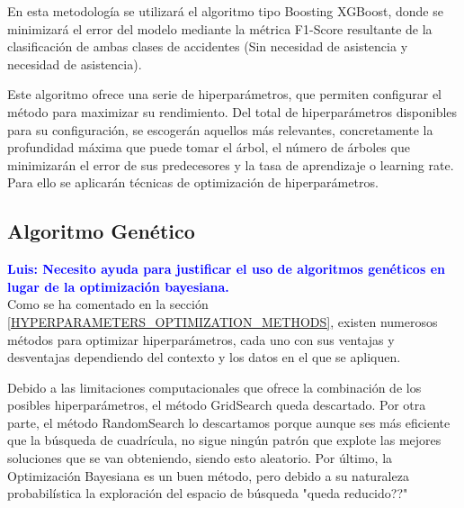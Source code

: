 \documentclass{uathesis-es}
\begin{document}
En esta metodología se utilizará el algoritmo tipo Boosting XGBoost, donde se minimizará el error del modelo mediante la métrica F1-Score resultante de la clasificación de ambas clases de accidentes (Sin necesidad de asistencia y necesidad de asistencia).

Este algoritmo ofrece una serie de hiperparámetros, que permiten configurar el método para maximizar su rendimiento. Del total de hiperparámetros disponibles para su configuración, se escogerán aquellos más relevantes, concretamente la profundidad máxima que puede tomar el árbol, el número de árboles que minimizarán el error de sus predecesores y  la tasa de aprendizaje o learning rate. Para ello se aplicarán técnicas de optimización de hiperparámetros.


 


\subsection{Algoritmo Genético}

\textcolor{blue}{\textbf{Luis: Necesito ayuda para justificar el uso de algoritmos genéticos en lugar de la optimización bayesiana.}}\\

Como se ha comentado en la sección \ref{HYPERPARAMETERS_OPTIMIZATION_METHODS}, existen numerosos métodos para optimizar hiperparámetros, cada uno con sus ventajas y desventajas dependiendo del contexto y los datos en el que se apliquen.

Debido a las limitaciones computacionales que ofrece la combinación de los posibles hiperparámetros, el método GridSearch queda descartado. Por otra parte, 	el método RandomSearch lo descartamos porque aunque ses más eficiente que la búsqueda de cuadrícula, no sigue ningún patrón que explote las mejores soluciones que se van obteniendo, siendo esto aleatorio. Por último, la Optimización Bayesiana es un buen método, pero debido a su naturaleza probabilística la exploración del espacio de búsqueda "queda reducido??"
\end{document}
